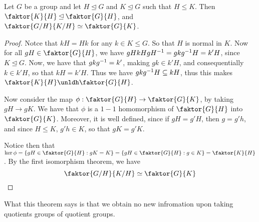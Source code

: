 \begin{theorem}\label{theorem_3.4.3}
  Let $G$ be a group and let  $H \unlhd G$ and  $K \unlhd G$ such that  $H
  \leq K$. Then $\faktor{K}{H} \unlhd \faktor{G}{H}$, and
  $\faktor{G/H}{K/H} \simeq \faktor{G}{K}$.
\end{theorem}
\begin{proof}
  Notce that $kH=Hk$ for any $k \in K \leq G$. So that  $H$ is normal in  $K$.
  Now for all $gH \in \faktor{G}{H}$, we have $gHkHgH^{-1}=gkg^{-1}H=k'H$,
  since $K \unlhd G$. Now, we have that $gkg^{-1}=k'$, making $gk \in k'H$,
  and consequentially  $k \in k'H$, so that  $kH=k'H$. Thus we have
  $gkg^{-1}H \subseteq kH$, thus this makes $\faktor{K}{H} \unldh
  \faktor{G}{H}$.

  Now consider the map $\phi:\faktor{G}{H} \rightarrow \faktor{G}{K}$, by
  taking $gH \rightarrow gK$. We have that $\phi$ is a  $1-1$ homomorphism of
  $\faktor{G}{H}$ into $\faktor{G}{K}$. Moreover, it is well defined, since
  if $gH=g'H$, then $g=g'h$, and since $H \leq K$,  $g'h \in K$, so that
  $gK=g'K$.

  Notice then that  $\ker{\phi}=\{gH \in \faktor{G}{H} : gK=K\}=\{gH \in
  \faktor{G}{H} : g \in K\}=\faktor{K}{H}$. By the first isomorphism
  theorem, we have
  \begin{equation*}
    \faktor{G/H}{K/H} \simeq \faktor{G}{K}
  \end{equation*}
\end{proof}
\begin{remark}
  What this theorem says is that we obtain no new infromation upon taking
  quotients groups of quotient groups.
\end{remark}

